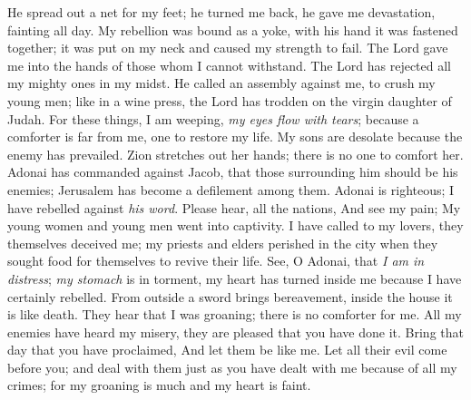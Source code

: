 \begin{biblechapter}
He spread out a net for my feet; 
he turned me back, 
he gave me devastation, 
fainting all day.
\verse My rebellion was bound as a yoke, 
with his hand it was fastened together; 
it was put on my neck 
and caused my strength to fail. 
The Lord gave me into the hands 
of those whom I cannot withstand.
\verse The Lord has rejected 
all my mighty ones in my midst. 
He called an assembly against me, 
to crush my young men; 
like in a wine press, 
the Lord has trodden on 
the virgin daughter of Judah.
\verse For these things, I am weeping, 
\textit{my eyes flow with tears}; 
because a comforter is far from me, 
one to restore my life. 
My sons are desolate 
because the enemy has prevailed.
\verse Zion stretches out her hands; 
there is no one to comfort her. 
Adonai has commanded against Jacob, 
that those surrounding him should be his enemies; 
Jerusalem has become 
a defilement among them.
\verse Adonai is righteous; 
I have rebelled against \textit{his word}. 
Please hear, all the nations, 
And see my pain; 
My young women and young men 
went into captivity.
\verse I have called to my lovers, 
they themselves deceived me; 
my priests and elders perished in the city 
when they sought food for themselves 
to revive their life.
\verse See, O Adonai, that \textit{I am in distress}; 
\textit{my stomach} is in torment, 
my heart has turned inside me 
because I have certainly rebelled. 
From outside a sword brings bereavement, 
inside the house it is like death.
\verse They hear that I was groaning; 
there is no comforter for me. 
All my enemies have heard my misery, 
they are pleased that you have done it. 
Bring that day that you have proclaimed, 
And let them be like me.
\verse Let all their evil come before you; 
and deal with them 
just as you have dealt with me 
because of all my crimes; 
for my groaning is much and my heart is faint.
\end{biblechapter}

